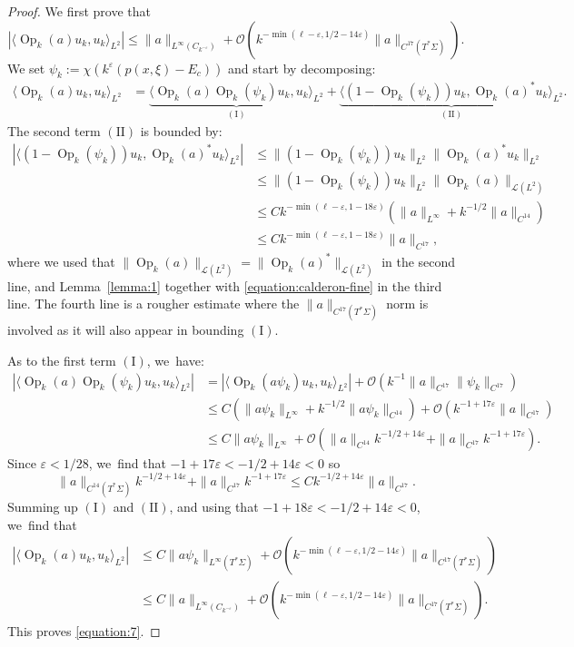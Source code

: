 \documentclass[JEP,XML,SOM,Unicode,published]{cedram}
\theoremstyle{plain}
\theoremstyle{definition}
\let\mc\mathcal
\let\eps\varepsilon
\DeclareMathOperator{\Op}{Op}
\begin{document}
\begin{proof}
We first prove that
\begin{equation}
\label{equation:7}
|\langle\Op_k(a)u_k,u_k\rangle_{L^2}| \leq \|a\|_{L^{\infty}(C_{k^{-\eps}})} + \mc{O}(k^{-\min(\ell-\eps, 1/2-14\eps)}\|a\|_{C^{17}(T^*\Sigma)}).
\end{equation}
We set $\psi_k := \chi(k^\eps (p(x,\xi)-E_c))$ and start by decomposing:
\[
\begin{split}
\langle \Op_k(a)u_k,u_k\rangle_{L^2} & = \underbrace{\langle \Op_k(a)\Op_k(\psi_k) u_k,u_k\rangle_{L^2}}_{\mathrm{(I)}} + \underbrace{\langle (1-\Op_k(\psi_k))u_k,\Op_k(a)^*u_k\rangle_{L^2}}_{\mathrm{(II)}}.
\end{split}
\]
The second term $\mathrm{(II)}$ is bounded by:
\[
\begin{split}
|\langle (1-\Op_k(\psi_k))u_k,\Op_k(a)^*u_k\rangle_{L^2}| & \leq \|(1-\Op_k(\psi_k))u_k\|_{L^2} \|\Op_k(a)^*u_k\|_{L^2} \\
& \leq \|(1-\Op_k(\psi_k))u_k\|_{L^2} \|\Op_k(a)\|_{\mathcal{L}(L^2)} \\
& \leq C k^{-\min(\ell-\eps,1-18\eps)} (\|a\|_{L^\infty} + k^{-1/2}\|a\|_{C^{14}}) \\
& \leq Ck^{-\min(\ell-\eps,1-18\eps)}\|a\|_{C^{17}},
\end{split}
\]
where we used that $\|\Op_k(a)\|_{\mathcal{L}(L^2)} = \|\Op_k(a)^*\|_{\mathcal{L}(L^2)}$
in the second line, and Lem\-ma~\ref{lemma:1} together with
\eqref{equation:calderon-fine} in the third line. The fourth line is a rougher estimate where the $\|a\|_{C^{17}(T^*\Sigma)}$ norm is involved as it will also appear in bounding $\mathrm{(I)}$.

As to the first term $\mathrm{(I)}$, we~have:
\[
\begin{split}
|\langle \Op_k(a)\Op_k(\psi_k) u_k,u_k\rangle_{L^2}| &= |\langle \Op_k(a\psi_k)u_k,u_k\rangle_{L^2}| + \mc{O}(k^{-1}\|a\|_{C^{17}}\|\psi_k\|_{C^{17}}) \\
& \leq C(\|a\psi_k\|_{L^\infty} + k^{-1/2}\|a\psi_k\|_{C^{14}}) + \mc{O}(k^{-1+17\eps}\|a\|_{C^{17}}) \\
& \leq C \|a\psi_k\|_{L^\infty} + \mc{O}(\|a\|_{C^{14}}k^{-1/2+14\eps}+\|a\|_{C^{17}}k^{-1+17\eps}).
\end{split}
\]
Since $\eps < 1/28$, we~find that $-1+17\eps < -1/2 + 14\eps < 0$ so
\[
\|a\|_{C^{14}(T^*\Sigma)}k^{-1/2+14\eps}+\|a\|_{C^{17}}k^{-1+17\eps} \leq C k^{-1/2+14\eps} \|a\|_{C^{17}}.
\]
Summing up $\mathrm{(I)}$ and $\mathrm{(II)}$, and using that $-1+18\eps < -1/2+14\eps < 0$, we~find that
\[
\begin{split}
| \langle \Op_k(a)u_k,u_k\rangle_{L^2}| &\leq C \|a\psi_k\|_{L^\infty(T^*\Sigma)} + \mc{O}(k^{-\min(\ell-\eps, 1/2-14\eps)}\|a\|_{C^{17}(T^*\Sigma)}) \\
& \leq C \|a\|_{L^\infty(C_{k^{-\eps}})} + \mc{O}(k^{-\min(\ell-\eps, 1/2-14\eps)}\|a\|_{C^{17}(T^*\Sigma)}).
\end{split}
\]
This proves \eqref{equation:7}.


\end{proof}
\end{document}
